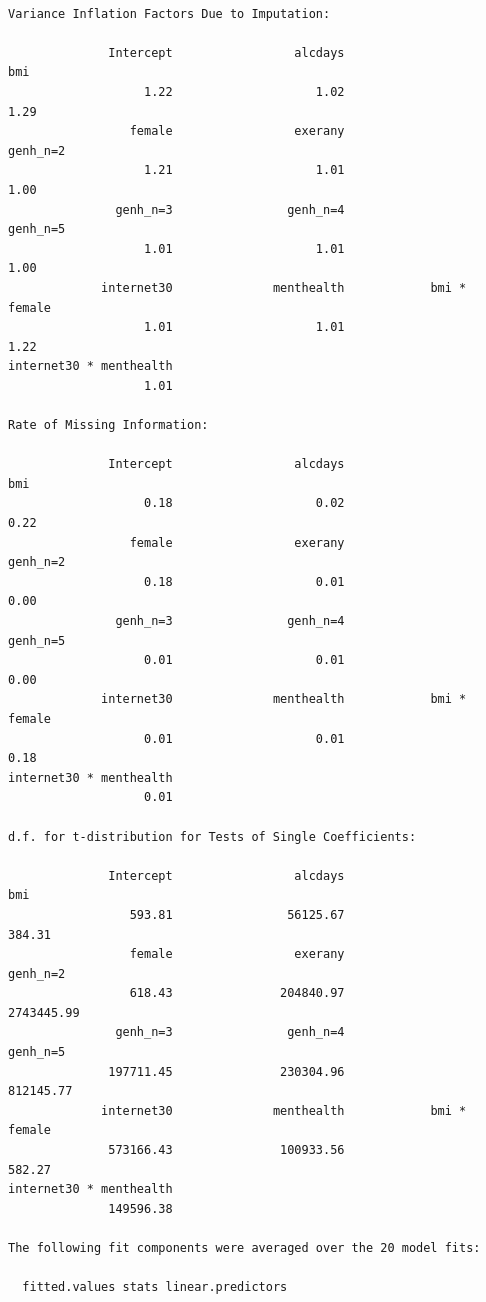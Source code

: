 \documentclass[]{book}
\theoremstyle{definition}
\theoremstyle{definition}
\theoremstyle{definition}
\theoremstyle{remark}
\begin{document}
\begin{verbatim}

Variance Inflation Factors Due to Imputation:

              Intercept                 alcdays                     bmi 
                   1.22                    1.02                    1.29 
                 female                 exerany                genh_n=2 
                   1.21                    1.01                    1.00 
               genh_n=3                genh_n=4                genh_n=5 
                   1.01                    1.01                    1.00 
             internet30              menthealth            bmi * female 
                   1.01                    1.01                    1.22 
internet30 * menthealth 
                   1.01 

Rate of Missing Information:

              Intercept                 alcdays                     bmi 
                   0.18                    0.02                    0.22 
                 female                 exerany                genh_n=2 
                   0.18                    0.01                    0.00 
               genh_n=3                genh_n=4                genh_n=5 
                   0.01                    0.01                    0.00 
             internet30              menthealth            bmi * female 
                   0.01                    0.01                    0.18 
internet30 * menthealth 
                   0.01 

d.f. for t-distribution for Tests of Single Coefficients:

              Intercept                 alcdays                     bmi 
                 593.81                56125.67                  384.31 
                 female                 exerany                genh_n=2 
                 618.43               204840.97              2743445.99 
               genh_n=3                genh_n=4                genh_n=5 
              197711.45               230304.96               812145.77 
             internet30              menthealth            bmi * female 
              573166.43               100933.56                  582.27 
internet30 * menthealth 
              149596.38 

The following fit components were averaged over the 20 model fits:

  fitted.values stats linear.predictors 
\end{verbatim}
\end{document}
